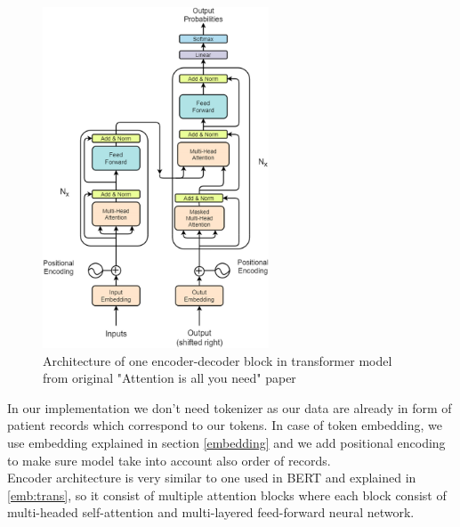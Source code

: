 \begin{figure}[!h]
	\centering
	
	\includegraphics[width=0.6\textwidth]{images/trans_arch.png}
	
	\caption{Architecture of one encoder-decoder block in transformer model from original "Attention is all you need" paper \cite{attentionAllYouNeed}}
	\label{fig:trans}
\end{figure}

In our implementation we don't need tokenizer as our data are already in form of patient records which correspond to our tokens. In case of token embedding, we use embedding explained in section \ref{embedding} and we add positional encoding to make sure model take into account also order of records.
\\

Encoder architecture is very similar to one used in BERT and explained in \ref{emb:trans}, so it consist of multiple attention blocks where each block consist of multi-headed self-attention and multi-layered feed-forward neural network.
\\

